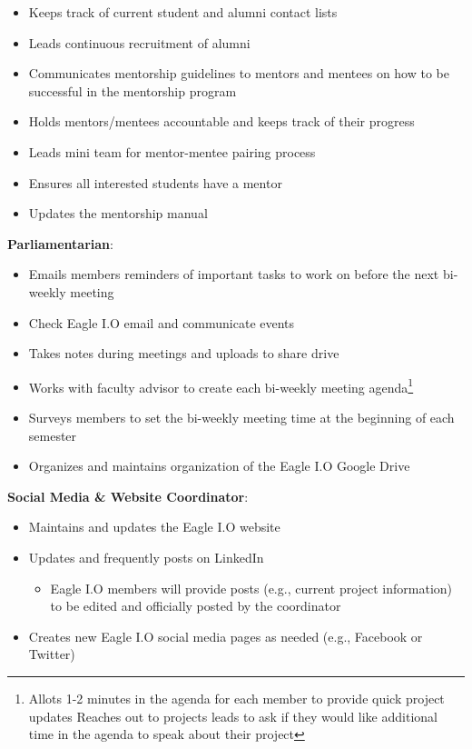 \documentclass[
]{book}
\providecommand{\tightlist}{%
  \setlength{\itemsep}{0pt}\setlength{\parskip}{0pt}}
\begin{document}
\begin{itemize}
\tightlist
\item
  Keeps track of current student and alumni contact lists\\
\item
  Leads continuous recruitment of alumni\\
\item
  Communicates mentorship guidelines to mentors and mentees on how to be successful in the mentorship program\\
\item
  Holds mentors/mentees accountable and keeps track of their progress\\
\item
  Leads mini team for mentor-mentee pairing process\\
\item
  Ensures all interested students have a mentor
\item
  Updates the mentorship manual
\end{itemize}

\textbf{Parliamentarian}:

\begin{itemize}
\tightlist
\item
  Emails members reminders of important tasks to work on before the next bi-weekly meeting
\item
  Check Eagle I.O email and communicate events
\item
  Takes notes during meetings and uploads to share drive\\
\item
  Works with faculty advisor to create each bi-weekly meeting agenda\footnote{Allots 1-2 minutes in the agenda for each member to provide quick project updates Reaches out to projects leads to ask if they would like additional time in the agenda to speak about their project}
\item
  Surveys members to set the bi-weekly meeting time at the beginning of each semester
\item
  Organizes and maintains organization of the Eagle I.O Google Drive
\end{itemize}

\textbf{Social Media \& Website Coordinator}:

\begin{itemize}
\tightlist
\item
  Maintains and updates the Eagle I.O website
\item
  Updates and frequently posts on LinkedIn

  \begin{itemize}
  \tightlist
  \item
    Eagle I.O members will provide posts (e.g., current project information) to be edited and officially posted by the coordinator
  \end{itemize}
\item
  Creates new Eagle I.O social media pages as needed (e.g., Facebook or Twitter)
\end{itemize}
\end{document}

